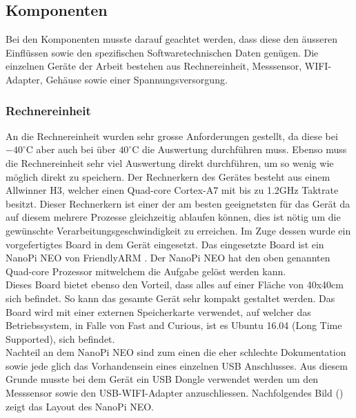 \subsection{Komponenten}
Bei den Komponenten musste darauf geachtet werden, dass diese den äusseren Einflüssen sowie den spezifischen Softwaretechnischen Daten genügen. Die einzelnen Geräte der Arbeit bestehen aus Rechnereinheit, Messsensor, WIFI-Adapter, Gehäuse sowie einer Spannungsversorgung.

\subsubsection{Rechnereinheit}
An die Rechnereinheit wurden sehr grosse Anforderungen gestellt, da diese bei $-40^\circ\text{C}$ aber auch bei über $40^\circ\text{C}$ die Auswertung durchführen muss. Ebenso muss die Rechnereinheit sehr viel Auswertung direkt durchführen, um so wenig wie möglich direkt zu speichern. Der Rechnerkern des Gerätes besteht aus einem Allwinner H3, welcher einen Quad-core Cortex-A7 mit bis zu 1.2GHz Taktrate besitzt. Dieser Rechnerkern ist einer der am besten geeignetsten für das Gerät da auf diesem mehrere Prozesse gleichzeitig ablaufen können, dies ist nötig um die gewünschte Verarbeitungsgeschwindigkeit zu erreichen. Im Zuge dessen wurde ein vorgefertigtes Board in dem Gerät eingesetzt. Das eingesetzte Board ist ein NanoPi NEO von FriendlyARM \cite{NanoPi}. Der NanoPi NEO hat den oben genannten Quad-core Prozessor mitwelchem die Aufgabe gelöst werden kann. \\
Dieses Board bietet ebenso den Vorteil, dass alles auf einer Fläche von 40x40cm sich befindet. So kann das gesamte Gerät sehr kompakt gestaltet werden. Das Board wird mit einer externen Speicherkarte verwendet, auf welcher das Betriebssystem, in Falle von Fast and Curious, ist es Ubuntu 16.04 (Long Time Supported), sich befindet. \\
Nachteil an dem NanoPi NEO sind zum einen die eher schlechte Dokumentation sowie jede glich das Vorhandensein eines einzelnen USB Anschlusses. Aus diesem Grunde musste bei dem Gerät ein USB Dongle verwendet werden um den Messsensor sowie den USB-WIFI-Adapter anzuschliessen. Nachfolgendes Bild () zeigt das Layout des NanoPi NEO.

